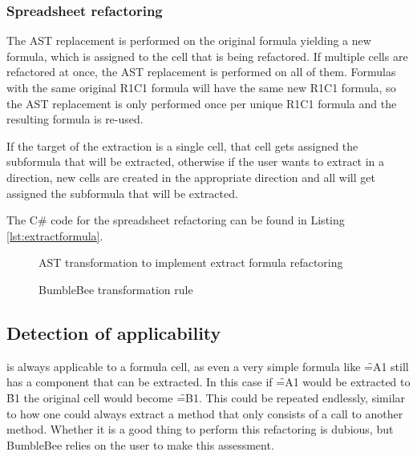 \subsubsection{Spreadsheet refactoring}

The AST replacement is performed on the original formula yielding a new formula, which is assigned to the cell that is being refactored.
If multiple cells are refactored at once, the AST replacement is performed on all of them.
Formulas with the same original R1C1 formula will have the same new R1C1 formula, so the AST replacement is only performed once per unique R1C1 formula and the resulting formula is re-used.

If the target of the extraction is a single cell, that cell gets assigned the subformula that will be extracted, otherwise if the user wants to extract in a direction, new cells are created in the appropriate direction and all will get assigned the subformula that will be extracted.

The C\# code for the spreadsheet refactoring can be found in Listing \ref{lst:extractformula}.

\begin{figure}
	\centering
	
	\caption{AST transformation to implement extract formula refactoring}
	\label{fig:extractformulaASTtransformations}
\end{figure}

\begin{figure}
	\centering
	
	\caption{BumbleBee transformation rule}
	\label{fig:bbv1transformationrule}
\end{figure}

\newpage

\subsection{Detection of applicability}

 is always applicable to a formula cell, as even a very simple formula like \f{=A1} still has a component that can be extracted.
In this case if \f{=A1} would be extracted to \f{B1} the original cell would become \f{=B1}.
This could be repeated endlessly, similar to how one could always extract a method that only consists of a call to another method.
Whether it is a good thing to perform this refactoring is dubious, but BumbleBee relies on the user to make this assessment.

